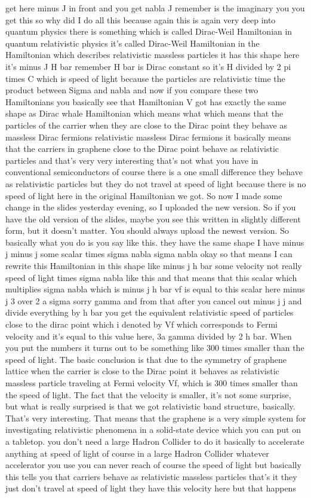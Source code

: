 get here minus J in front and you get nabla J remember is the imaginary you you get this so why did I do all this because again this is again very deep into quantum physics there is something which is called Dirac-Weil Hamiltonian in quantum relativistic physics it's called Dirac-Weil Hamiltonian in the Hamiltonian which describes relativistic massless particles it has this shape here it's minus J H bar remember H bar is Dirac constant so it's H divided by 2 pi times C which is speed of light because the particles are relativistic time the product between Sigma and nabla and now if you compare these two Hamiltonians you basically see that Hamiltonian V got has exactly the same shape as Dirac whale Hamiltonian which means what which means that the particles of the carrier when they are close to the Dirac point they behave as massless Dirac fermions relativistic massless Dirac fermions it basically means that the carriers in graphene close to the Dirac point behave as relativistic particles and that's very very interesting that's not what you have in conventional semiconductors of course there is a one small difference they behave as relativistic particles but they do not travel at speed of light because there is no speed of light here in the original Hamiltonian we got. So now I made some change in the slides yesterday evening, so I uploaded the new version. So if you have the old version of the slides, maybe you see this written in slightly different form, but it doesn't matter. You should always upload the newest version. So basically what you do is you say like this. they have the same shape I have minus j minus j some scalar times sigma nabla sigma nabla okay so that means I can rewrite this Hamiltonian in this shape like minus j h bar some velocity not really speed of light times sigma nabla like this and that means that this scalar which multiplies sigma nabla which is minus j h bar vf is equal to this scalar here minus j 3 over 2 a sigma sorry gamma and from that after you cancel out minus j j and divide everything by h bar you get the equivalent relativistic speed of particles close to the dirac point which i denoted by Vf which corresponds to Fermi velocity and it's equal to this value here, 3a gamma divided by 2 h bar. When you put the numbers it turns out to be something like 300 times smaller than the speed of light. The basic conclusion is that due to the symmetry of graphene lattice when the carrier is close to the Dirac point it behaves as relativistic massless particle traveling at Fermi velocity Vf, which is 300 times smaller than the speed of light. The fact that the velocity is smaller, it's not some surprise, but what is really surprised is that we got relativistic band structure, basically. That's very interesting. That means that the graphene is a very simple system for investigating relativistic phenomena in a solid-state device which you can put on a tabletop. you don't need a large Hadron Collider to do it basically to accelerate anything at speed of light of course in a large Hadron Collider whatever accelerator you use you can never reach of course the speed of light but basically this tells you that carriers behave as relativistic massless particles that's it they just don't travel at speed of light they have this velocity here but that happens 